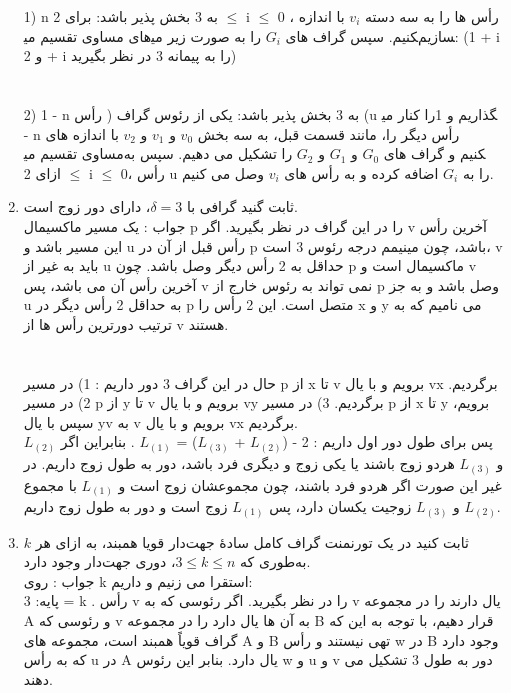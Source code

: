 \documentclass{ut}
\begin{document}
\begin{enumerate}
    1) n  به 3 بخش پذیر باشد: برای 2 $\leq$ i $\leq$ 0 ، رأس ها را به سه دسته $v_i$ با اندازه های مساوی تقسیم می‎کنیم. سپس گراف های $G_i$ را به صورت زیر می‎سازیم: (1 + i   و  2 + i  را به پیمانه 3 در نظر بگیرید)\\
    \\
    \\
    2) 1 - n به 3 بخش پذیر باشد: یکی از رئوس گراف ( رأس (u را کنار می‎گذاریم و 1 - n رأس دیگر را، مانند قسمت قبل، به سه بخش  $v_0$ و $v_1$ و $v_2$ با اندازه های مساوی تقسیم می‎کنیم و گراف های $G_0$ و $G_1$ و $G_2$ را تشکیل می دهیم. 
    سپس به ازای 2 $\leq$ i $\leq$ 0،  رأس u را به $G_i$ اضافه کرده و به رأس های $v_i$ وصل می کنیم.
    \item
   ثابت گنید گرافی با $\delta=3$، دارای دور زوج است.\\
   {\color{Red} جواب :}
   یک مسیر ماکسیمال p را در این گراف در نظر بگیرید. اگر v آخرین رأس این مسیر باشد و u رأس قبل  از آن در p باشد، چون مینیمم درجه رئوس 3 است، v باید به غیر از u حداقل به 2 رأس دیگر وصل باشد. چون p ماکسیمال است و v آخرین رأس آن می باشد، پس v نمی تواند به رئوس خارج از p وصل باشد و به جز u به حداقل 2 رأس دیگر در p متصل است. این 2 رأس را x و y می نامیم که به ترتیب دورترین رأس ها از v هستند. 
    \\
    \\
    \\
    حال در این گراف 3 دور داریم : 1) در مسیر p از x تا v برویم و با یال vx برگردیم. 2) در مسیر p از y تا v برویم و با یال vy برگردیم. 3) در مسیر p از x تا y برویم، سپس با یال yv به v برویم  و با یال vx برگردیم.\\
    پس برای طول دور اول داریم : 2 - ($L_{(2)}$ + $L_{(3)}$) = $L_{(1)}$ .
     بنابراین اگر $L_{(2)}$ و $L_{(3)}$ هردو زوج باشند یا یکی زوج و دیگری فرد باشد، دور به طول زوج داریم. در غیر این صورت اگر هردو فرد باشند، چون مجموعشان زوج است و $L_{(1)}$ با مجموع $L_{(2)}$ و $L_{(3)}$ زوجیت یکسان دارد، پس $L_{(1)}$ زوج است و دور به طول زوج داریم. 
    \item
    ثابت کنید در یک تورنمنت گراف کامل سادهٔ جهت‌دار قویا همبند، به ازای هر $k$ به‌طوری که $3 \leq k \leq n$، دوری جهت‌دار وجود دارد.\\
    {\color{Red} جواب :}
    روی k استقرا می زنیم و داریم: \\
    پایه: 3 = k . رأس v را در نظر بگیرید. اگر رئوسی که به v یال دارند را در مجموعه A و رئوسی که v به آن ها یال دارد را در مجموعه B قرار دهیم، با توجه به این که گراف قویاً همبند است، مجموعه های A و B تهی نیستند و رأس w در B وجود دارد که به رأس u در A یال دارد. بنابر این رئوس w و u و v دور به طول 3 تشکیل می دهند.\\

\end{enumerate}
\end{document}
